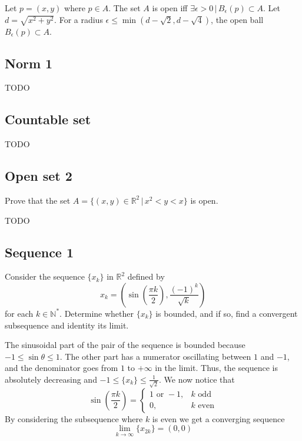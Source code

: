 \documentclass[a4paper]{article}
\begin{document}
Let \(p = (x,y)\) where \(p \in A\).
The set \(A\) is open iff \(\exists \epsilon > 0 \,|\, B_\epsilon(p) \subset A \).
Let \(d = \sqrt{x^2 + y^2}\). For a radius \(\epsilon \leq \min(d-\sqrt{2}, d-\sqrt{4})\),
the open ball \(B_\epsilon(p) \subset A\).

\subsection{Norm 1}

TODO

\subsection{Countable set}

TODO %

\subsection{Open set 2}

Prove that the set \(A=\{(x,y) \in {\mathbb{R}}^2 \,|\, x^2<y<x\}\)
is open.

TODO

\subsection{Sequence 1}

Consider the sequence \(\{x_k\}\) in \({\mathbb{R}}^2\)
defined by \[ x_k = \left( \sin\left(\frac{\pi k}{2}\right), \frac{{(-1)}^k}{\sqrt{k}} \right) \]
for each \(k \in {\mathbb{N}}^*\).
Determine whether \(\{x_k\}\) is bounded, and if so, find a convergent subsequence
and identity its limit.

The sinusoidal part of the pair of the sequence is bounded because \(-1 \leq \sin\theta \leq 1\).
The other part has a numerator oscillating between \(1\) and \(-1\),
and the denominator goes from \(1\) to \(+\infty\) in the limit.
Thus, the sequence is absolutely decreasing and \(-1 \leq \{x_k\} \leq \frac{1}{\sqrt{2}}\).
We now notice that
\[
    \sin\left(\frac{\pi k}{2}\right)
    = \begin{cases}
        1 \text{ or } -1, & k \text{ odd} \\
        0, & k \text{ even}
    \end{cases}
\]
By considering the subsequence where \(k\) is even we get a converging sequence
\[
    \lim_{k \to \infty} \{x_{2k}\} = (0, 0) 
\]
\end{document}
